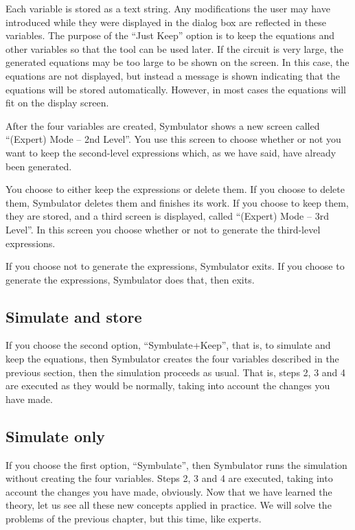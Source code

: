 Each variable is stored as a text string. Any modifications the user
may have introduced while they were displayed in the dialog box are
reflected in these variables. The purpose of the ``Just Keep''
option is to keep the equations and other variables so that the
 tool can be used later. If the circuit is very large,
the generated equations may be too large to be shown on the screen.
In this case, the equations are not displayed, but instead a message
is shown indicating that the equations will be stored automatically.
However, in most cases the equations will fit on the display screen.

After the four variables are created, Symbulator shows a new screen
called ``(Expert) Mode -- 2nd Level''. You use this screen to choose
whether or not you want to keep the second-level expressions which,
as we have said, have already been generated.

You choose to either keep the expressions or delete them. If you
choose to delete them, Symbulator deletes them and finishes its
work. If you choose to keep them, they are stored, and a third
screen is displayed, called ``(Expert) Mode -- 3rd Level''. In this
screen you choose whether or not to generate the third-level
expressions.

If you choose not to generate the expressions, Symbulator exits. If
you choose to generate the expressions, Symbulator does that, then
exits.

\subsection{Simulate and store}

If you choose the second option, ``Symbulate+Keep'', that is, to
simulate and keep the equations, then Symbulator creates the four
variables described in the previous section, then the simulation
proceeds as usual. That is, steps 2, 3 and 4 are executed as they
would be normally, taking into account the changes you have made.

\subsection{Simulate only}

If you choose the first option, ``Symbulate'', then Symbulator runs
the simulation without creating the four variables. Steps 2, 3 and 4
are executed, taking into account the changes you have made,
obviously. Now that we have learned the theory, let us see all these
new concepts applied in practice. We will solve the problems of the
previous chapter, but this time, like experts.

